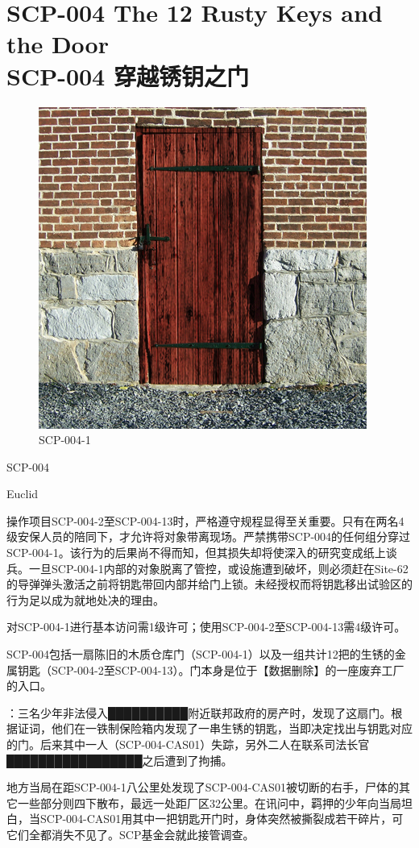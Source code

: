 \chapter[SCP-004 穿越锈钥之门]{
	SCP-004 The 12 Rusty Keys and the Door\\
	SCP-004 穿越锈钥之门
}

\label{chap:SCP-004}

\begin{figure}[H]
	\centering
	\includegraphics[width=0.5\linewidth]{images/SCP-004.jpg}
	\caption*{SCP-004-1}
\end{figure}

SCP-004

Euclid

操作项目SCP-004-2至SCP-004-13时，严格遵守规程显得至关重要。只有在两名4级安保人员的陪同下，才允许将对象带离现场。严禁携带SCP-004的任何组分穿过SCP-004-1。该行为的后果尚不得而知，但其损失却将使深入的研究变成纸上谈兵。一旦SCP-004-1内部的对象脱离了管控，或设施遭到破坏，则必须赶在Site-62的导弹弹头激活之前将钥匙带回内部并给门上锁。未经授权而将钥匙移出试验区的行为足以成为就地处决的理由。

对SCP-004-1进行基本访问需1级许可；使用SCP-004-2至SCP-004-13需4级许可。

SCP-004包括一扇陈旧的木质仓库门（SCP-004-1）以及一组共计12把的生锈的金属钥匙（SCP-004-2至SCP-004-13）。门本身是位于【数据删除】的一座废弃工厂的入口。


：三名少年非法侵入██████████附近联邦政府的房产时，发现了这扇门。根据证词，他们在一铁制保险箱内发现了一串生锈的钥匙，当即决定找出与钥匙对应的门。后来其中一人（SCP-004-CAS01）失踪，另外二人在联系司法长官█████████████████之后遭到了拘捕。

地方当局在距SCP-004-1八公里处发现了SCP-004-CAS01被切断的右手，尸体的其它一些部分则四下散布，最远一处距厂区32公里。在讯问中，羁押的少年向当局坦白，当SCP-004-CAS01用其中一把钥匙开门时，身体突然被撕裂成若干碎片，可它们全都消失不见了。SCP基金会就此接管调查。

